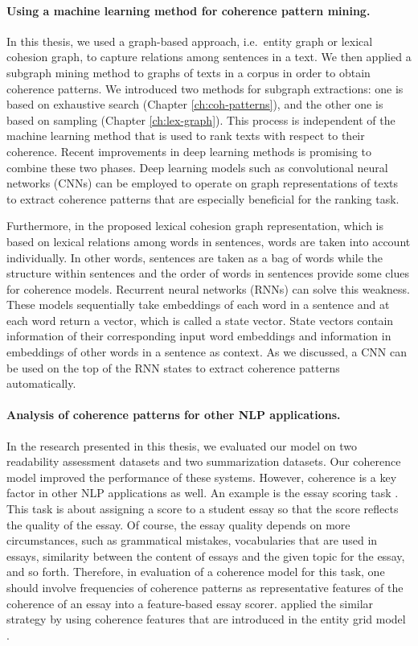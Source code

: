\paragraph{Using a machine learning method for coherence pattern mining.} 
In this thesis, we used a graph-based approach, i.e.\ entity graph or lexical cohesion graph, to capture relations among sentences in a text. 
We then applied a subgraph mining method to graphs of texts in a corpus in order to obtain coherence patterns. 
We introduced two methods for subgraph extractions: one is based on exhaustive search (Chapter \ref{ch:coh-patterns}), and the other one is based on sampling (Chapter \ref{ch:lex-graph}). 
This process is independent of the machine learning method that is used to rank texts with respect to their coherence. 
Recent improvements in deep learning methods is promising to combine these two phases. 
Deep learning models such as convolutional neural networks (CNNs) \cite{kimyoon14} can be employed to operate on graph representations of texts to extract coherence patterns that are especially beneficial for the ranking task. 

Furthermore, in the proposed lexical cohesion graph representation, which is based on lexical relations among words in sentences, words are taken into account individually. 
In other words, sentences are taken as a bag of words while the structure within sentences \cite{louis12} and the order of words in sentences provide some clues for coherence models. 
Recurrent neural networks (RNNs) can solve this weakness. 
These models sequentially take embeddings of each word in a sentence and at each word return a vector, which is called a state vector.  
State vectors contain information of their corresponding input word embeddings and information in embeddings of other words in a sentence as context.  
As we discussed, a CNN can be used on the top of the RNN states to extract coherence patterns automatically. 

\paragraph{Analysis of coherence patterns for other NLP applications.}
In the research presented in this thesis, we evaluated our model on two readability assessment datasets and two summarization datasets. 
Our coherence model improved the performance of these systems. 
However, coherence is a key factor in other NLP applications as well. 
An example is the essay scoring task \cite{dikli06,higgins04,miltsakaki04a,}.  
This task is about assigning a score to a student essay so that the score reflects the quality of the essay. 
Of course, the essay quality depends on more circumstances, such as grammatical mistakes, vocabularies that are used in essays, similarity between the content of essays and the given topic for the essay, and so forth. 
Therefore, in evaluation of a coherence model for this task, one should involve frequencies of coherence patterns as representative features of the coherence of an essay into a feature-based essay scorer. 
 applied the similar strategy by using coherence features that are introduced in the entity grid model \cite{barzilay05a}. 

